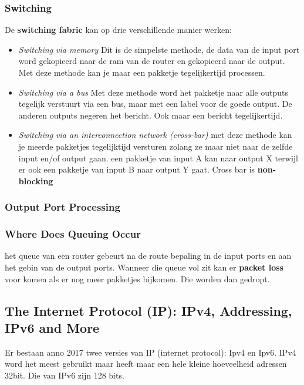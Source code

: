 \subsubsection{Switching}
De \textbf{switching fabric} kan op drie verschillende manier werken:
\begin{itemize}
    \item \textit{Switching via memory} Dit is de simpelste methode, de data van de input port word gekopieerd naar de ram van de router en gekopieerd naar de output. Met deze methode kan je maar een pakketje tegelijkertijd processen.
    \item \textit{Switching via a bus} Met deze methode word het pakketje naar alle outputs tegelijk verstuurt via een bus, maar met een label voor de goede output. De anderen outputs negeren het bericht. Ook maar een bericht tegelijkertijd.
    \item \textit{Switching via an interconnection network (cross-bar)} met deze methode kan je meerde pakketjes tegelijktijd versturen zolang ze maar niet naar de zelfde input en/of output gaan. een pakketje van input A kan naar output X terwijl er ook een pakketje van input B naar output Y gaat. Cross bar is \textbf{non-blocking}
\end{itemize}
\subsubsection{Output Port Processing}

\subsubsection{Where Does Queuing Occur}
het queue van een router gebeurt na de route bepaling in de input ports en aan het gebin van de output ports. Wanneer die queue vol zit kan er \textbf{packet loss} voor komen als er nog meer pakketjes bijkomen. Die worden dan gedropt.


\subsection{The Internet Protocol (IP): IPv4, Addressing, IPv6 and More}
 Er bestaan anno 2017 twee versies van IP (internet protocol): Ipv4 en Ipv6. IPv4 word het meest gebruikt maar heeft maar een hele kleine hoeveelheid adressen 32bit. Die van IPv6 zijn 128 bits.

